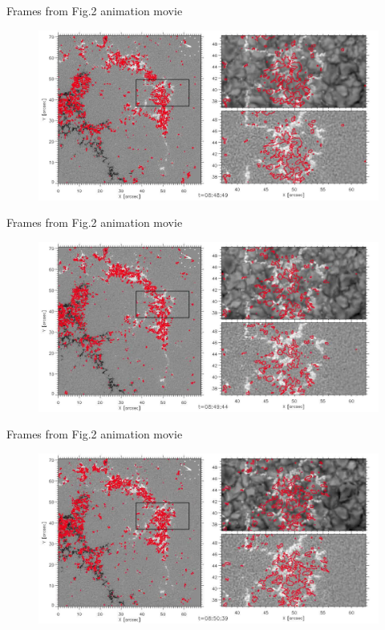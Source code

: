 \documentclass{beamer}
\begin{document}
\begin{frame}{Frames from Fig.2 animation movie}


\begin{figure}[H]
 \centering
 \includegraphics[scale=0.28]{output006.jpg}
\end{figure}

\end{frame}
\begin{frame}{Frames from Fig.2 animation movie}

\begin{figure}[H]
 \centering
 \includegraphics[scale=0.28]{output007.jpg}
\end{figure}

\end{frame}
\begin{frame}{Frames from Fig.2 animation movie}
\begin{figure}[H]
 \centering
 \includegraphics[scale=0.28]{output008.jpg}
\end{figure}

\end{frame}
\end{document}
